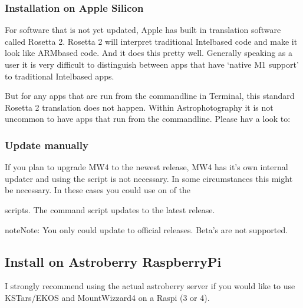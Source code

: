 \documentclass[a4paper,10pt,english]{sphinxmanual}
\begin{document}
\subsubsection{Installation on Apple Silicon}
\label{\detokenize{install/mw4:installation-on-apple-silicon}}
\sphinxAtStartPar
For software that is not yet updated, Apple has built in translation software
called Rosetta 2. Rosetta 2 will interpret  traditional Intel\sphinxhyphen{}based code and make
it look like ARM\sphinxhyphen{}based code. And it does this pretty well. Generally speaking as a
user it is very difficult to distinguish between apps that have ‘native M1
support’ to traditional Intel\sphinxhyphen{}based apps.

\sphinxAtStartPar
But for any apps that are run from the command\sphinxhyphen{}line in Terminal, this standard
Rosetta 2 translation does not happen. Within Astrophotography it is not uncommon
to have apps that run from the command\sphinxhyphen{}line. Please hav a look to:


\subsubsection{Update manually}
\label{\detokenize{install/mw4:update-manually}}
\sphinxAtStartPar
If you plan to upgrade MW4 to the newest release, MW4 has it’s own internal
updater and using the script is not necessary. In some circumstances this might
be necessary. In these cases you could use on of the

\begin{sphinxVerbatim}[commandchars=\\\{\}]
         
          
     
\end{sphinxVerbatim}

\sphinxAtStartPar
scripts. The command script updates to the latest release.

\begin{sphinxadmonition}{note}{Note:}
\sphinxAtStartPar
You only could update to official releases. Beta’s are not supported.
\end{sphinxadmonition}

\sphinxstepscope


\subsection{Install on Astroberry RaspberryPi}
\label{\detokenize{install/astroberry:install-on-astroberry-raspberrypi}}\label{\detokenize{install/astroberry::doc}}
\sphinxAtStartPar
I strongly recommend using the actual astroberry server 
if you would like to use KSTars/EKOS and MountWizzard4 on a Raspi (3 or 4).
\end{document}

